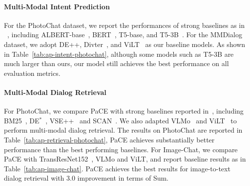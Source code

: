 \documentclass[11pt]{article}
\begin{document}
\paragraph{Multi-Modal Intent Prediction}
For the PhotoChat dataset, we report the performances of strong baselines as in ~\citep{zang2021photochat}, including ALBERT-base~\citep{lan2019albert}, BERT~\citep{devlin2018bert}, T5-base, and T5-3B~\citep{raffel2020exploring}. For the MMDialog dataset, we adopt DE++,  Divter~\citep{feng2022mmdialog}, and ViLT~\citep{kim2021vilt} as our baseline models. As shown in Table~\ref{tab:ap-intent-photochat},
although some models such as T5-3B are much larger than ours, our model still achieves the best performance on all evaluation metrics. 
\begin{table}[t!]
    \centering
    \caption{
    Multi-modal intent prediction results on PhotoChat and MMDialog.
    }
    \label{tab:ap-intent-photochat}
\end{table}



\paragraph{Multi-Modal Dialog Retrieval}
For PhotoChat, we compare PaCE with strong baselines reported in~\citep{zang2021photochat}, including BM25~\citep{robertson2009probabilistic}, 
DE$^*$~\citep{zang2021photochat},
VSE++~\citep{faghri2017vse++} and SCAN~\citep{lee2018stacked}. We also adapted VLMo~\citep{bao2021vlmo} and ViLT~\citep{kim2021vilt} to perform multi-modal dialog retrieval.
The results on PhotoChat are reported in Table~\ref{tab:ap-retrieval-photochat}, PaCE achieves substantially better performance than the best performing baselines. 
For Image-Chat, we compare PaCE with TransResNet152~\citep{liao2021mmconv}, VLMo and ViLT, and report baseline results as in Table~\ref{tab:ap-image-chat}. 
PaCE achieves the best results for image-to-text dialog retrieval with 3.0 improvement in terms of Sum.
\end{document}
